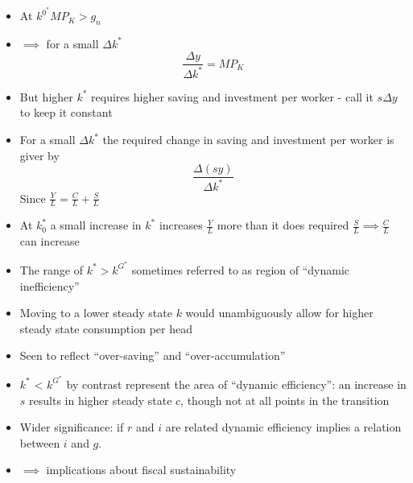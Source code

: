 \documentclass[a4paper,twoside]{article}
\numberwithin{equation}{section}
\numberwithin{figure}{section}
\begin{document}
	\begin{itemize}
		\item At \( k^{0^\ast} MP_K > g_n \)
		\item \( \implies \) for a small \( \Delta k^\ast \)
		\[
			\frac{\Delta y}{\Delta k^\ast} = MP_K
		\]
		\item But higher \( k^\ast \) requires higher saving and investment per worker - call it \( s \Delta y \) to keep it constant
		\item For a small \( \Delta k^\ast \) the required change in saving and investment per worker is giver by
		\[
			\frac{\Delta (sy)}{\Delta k^\ast}
		\]
		Since \( \frac{Y}{L} = \frac{C}{L} + \frac{S}{L} \)
		\item At \( k^\ast_0 \) a small increase in \( k^\ast \) increases \( \frac{Y}{L} \) more than it does required \( \frac{S}{L} \implies \frac{C}{L} \) can increase
		\item The range of \( k^\ast > k^{G^\ast} \) sometimes referred to as region of ``dynamic inefficiency''
		\item Moving to a lower steady state \( k \) would unambiguously allow for higher steady state consumption per head
		\item Seen to reflect ``over-saving'' and ``over-accumulation''
		\item \( k^\ast \) < \( k^{G^\ast} \) by contrast represent the area of ``dynamic efficiency'': an increase in \( s \) results in higher steady state \( c \), though not at all points in the transition
		\item Wider significance: if \( r \) and \( i \) are related dynamic efficiency implies a relation between \( i \) and \( g \).
		\item \( \implies \) implications about fiscal sustainability
	\end{itemize}
\end{document}
